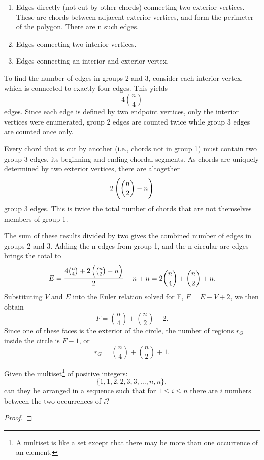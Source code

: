 \begin{solution}
\begin{enumerate}
\item Edges directly (not cut by other chords) connecting two exterior vertices. These are chords between adjacent exterior vertices, and form the perimeter of the polygon. There are n such edges.
\item Edges connecting two interior vertices.
\item Edges connecting an interior and exterior vertex.
\end{enumerate}

To find the number of edges in groups 2 and 3, consider each interior vertex, which is connected to exactly four edges. This yields
\[ 4\binom{n}{4} \]
edges. Since each edge is defined by two endpoint vertices, only the interior vertices were enumerated, group 2 edges are counted twice while group 3 edges are counted once only.

Every chord that is cut by another (i.e., chords not in group 1) must contain two group 3 edges, its beginning and ending chordal segments. As chords are uniquely determined by two exterior vertices, there are altogether
\[ 2\left(\binom{n}{2}-n\right) \]
group 3 edges. This is twice the total number of chords that are not themselves members of group 1.

The sum of these results divided by two gives the combined number of edges in groups 2 and 3. Adding the n edges from group 1, and the n circular arc edges brings the total to
\[ E=\frac{4\binom{n}{4}+2\left(\binom{n}{2}-n\right)}{2}+n+n=2\binom{n}{4}+\binom{n}{2}+n. \]
Substituting $V$ and $E$ into the Euler relation solved for F, $F=E-V+2$, we then obtain
\[ F=\binom{n}{4}+\binom{n}{2}+2. \]
Since one of these faces is the exterior of the circle, the number of regions $r_G$ inside the circle is $F-1$, or
\[ r_G=\binom{n}{4}+\binom{n}{2}+1. \]
\end{solution}
\pagebreak

\begin{prbm}
Given the multiset\footnote{A multiset is like a set except that there may be more than one occurrence of an element.} of positive integers:
\[ \{1,1,2,2,3,3,\dots,n,n\},\]
can they be arranged in a sequence such that for $1 \le i \le n$ there are $i$ numbers between the two occurrences of $i$?
\end{prbm}

\begin{proof}


\end{proof}
\pagebreak

